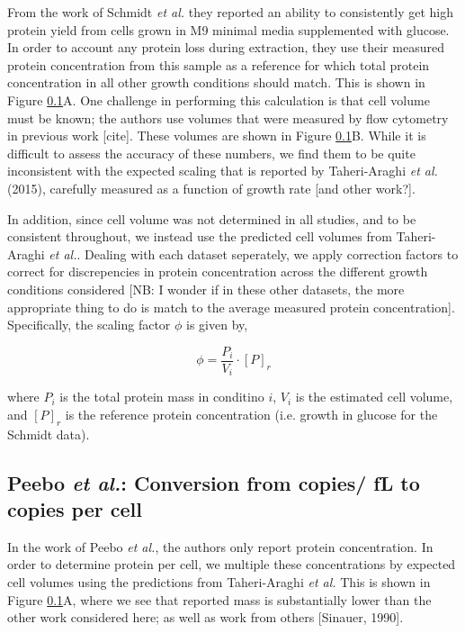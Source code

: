 \documentclass[11pt]{article}
\begin{document}
From the work of Schmidt {\it et al.} they reported an ability to consistently get high
protein yield from cells grown in M9 minimal media supplemented with glucose. In order
to account any protein loss during extraction, they use their measured protein concentration
from this sample as a reference for which total protein concentration in all other growth
conditions should match. This is shown in Figure \ref{}A. One challenge in
performing this calculation is that cell volume must be known; the authors use
volumes that were  measured by flow cytometry in previous work [cite]. These
volumes are shown in Figure \ref{}B. While it is difficult to assess the
accuracy of these numbers, we find them to be quite inconsistent with the
expected scaling that is reported by Taheri-Araghi {\it et al.} (2015),
carefully
measured as a function of growth rate [and other work?].

In addition,  since cell volume was not determined in all studies, and to be
consistent throughout, we instead use the predicted cell volumes from
Taheri-Araghi {\it et al.}. Dealing with each dataset seperately, we apply
correction  factors to correct for discrepencies in protein concentration across
the different growth conditions considered [NB: I wonder if in these other
datasets, the more appropriate thing to do is match to the average measured
protein concentration]. Specifically, the scaling factor $\phi$ is given by,

\begin{equation}
\phi  =  \frac{P_i}{V_i} \cdot [P]_r
\end{equation}

where $P_i$ is the total protein mass in conditino $i$, $V_i$ is the estimated cell volume, and $[P]_r$ is
the reference protein concentration (i.e. growth in  glucose for the Schmidt data).


\subsection{Peebo {\it et al.}: Conversion from copies/ fL to copies per cell}

In the work of Peebo {\it et al.}, the authors only report protein concentration.
In  order to determine protein per cell, we multiple these concentrations by
expected cell volumes  using the predictions from  Taheri-Araghi {\it et al.} This is
shown in Figure \ref{}A, where we see that reported mass is substantially lower than
the other work considered here; as well as work from others [Sinauer, 1990].
\end{document}
